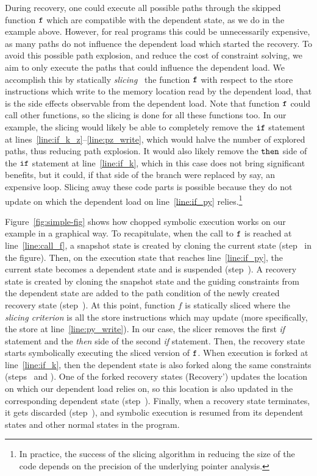During recovery, one could execute all possible paths through the
skipped function $\texttt{f}$ which are compatible with the dependent
state, as we do in the example above. However, for real programs this
could be unnecessarily expensive, as many paths do not influence the
dependent load which started the recovery. To avoid this possible path
explosion, and reduce the cost of constraint solving, we aim to only
execute the paths that could influence the dependent load. We
accomplish this by statically \emph{slicing}~\cite{Weiser:ICSE1981,
  Tip95asurvey, BinkleyH04, Xu:Slicing2005} the function $\texttt{f}$
with respect to the store instructions which write to the memory
location read by the dependent load, that is the side effects
observable from the dependent load. Note that function $\texttt{f}$
could call other functions, so the slicing is done for all these
functions too. In our example, the slicing would likely be able to
completely remove the $\texttt{if}$ statement at
lines~\ref{line:if_k_z}--\ref{line:pz_write}, which would halve the
number of explored paths, thus reducing path explosion. It would also
likely remove the $\texttt{then}$ side of the $\texttt{if}$ statement at
line~\ref{line:if_k}, which in this case does not bring significant
benefits, but it could, if that side of the branch were replaced by
say, an expensive loop. Slicing away these code parts is possible
because they do not update  on which the dependent load on
line~\ref{line:if_py} relies.\footnote{In practice, the success of the
  slicing algorithm in reducing the size of the code depends on the
  precision of the underlying pointer analysis.}

Figure~\ref{fig:simple-fig} shows how chopped symbolic execution works
on our example in a graphical way. To recapitulate, when the call to
$\texttt{f}$ is reached at line~\ref{line:call_f}, a snapshot state is
created by cloning the current state (step~ in the figure).
Then, on the execution state that reaches
line~\ref{line:if_py}, the current state becomes a dependent state and
is suspended (step~).
A recovery state is created by cloning the snapshot state
and the guiding constraints from the dependent state are added
to the path condition of the newly created recovery state (step~).
At this point, function $f$ is statically sliced
where the \textit{slicing criterion} is all the store instructions
which may update  (more specifically, the store at line~\ref{line:py_write}).
In our case, the slicer removes the first \textit{if} statement and the \textit{then} side
of the second \textit{if} statement. Then, the recovery state starts
symbolically executing the sliced version of $\texttt{f}$.  When execution
is forked at line~\ref{line:if_k}, then the dependent state is also
forked along the same constraints (steps~ and ). One
of the forked recovery states (Recovery') updates the location
 on which our dependent load relies on, so this location is
also updated in the corresponding dependent state
(step~). Finally, when a recovery state terminates,
it gets discarded  (step~), and
symbolic execution is resumed from its dependent states  and other
normal states in the program.

